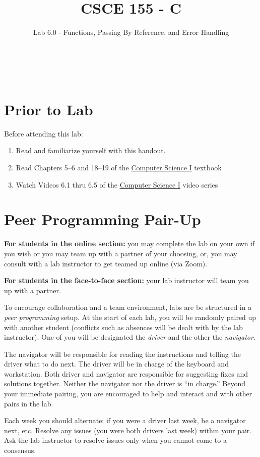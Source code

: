 \documentclass[12pt]{scrartcl}
\title{CSCE 155 - C}
\subtitle{Lab 6.0 - Functions, Passing By Reference, and Error Handling}
\author{~}
\date{~}
\begin{document}
\maketitle

\section*{Prior to Lab}

Before attending this lab:
\begin{enumerate}
  \item Read and familiarize yourself with this handout.
  \item Read Chapters 5--6 and 18--19 of the \href{http://cse.unl.edu/~cbourke/ComputerScienceOne.pdf}{Computer Science I} textbook
  \item Watch Videos 6.1 thru 6.5 of the \href{https://www.youtube.com/playlist?list=PL4IH6CVPpTZVkiEnCEOdGbYsFEdtKc5Bx}{Computer Science I} video series
\end{enumerate}

\section*{Peer Programming Pair-Up}

\textbf{For students in the online section:} you may complete
the lab on your own if you wish or you may team up with a partner
of your choosing, or, you may consult with a lab instructor to get
teamed up online (via Zoom).

\textbf{For students in the face-to-face section:} your
lab instructor will team you up with a partner.  

To encourage collaboration and a team environment, labs are be
structured in a \emph{peer programming} setup.  At the start of
each lab, you will be randomly paired up with another student 
(conflicts such as absences will be dealt with by the lab instructor).
One of you will be designated the \emph{driver} and the other
the \emph{navigator}.  

The navigator will be responsible for reading the instructions and
telling the driver what to do next.  The driver will be in charge of the
keyboard and workstation.  Both driver and navigator are responsible
for suggesting fixes and solutions together.  Neither the navigator
nor the driver is ``in charge.''  Beyond your immediate pairing, you
are encouraged to help and interact and with other pairs in the lab.

Each week you should alternate: if you were a driver last week, 
be a navigator next, etc.  Resolve any issues (you were both drivers
last week) within your pair.  Ask the lab instructor to resolve issues
only when you cannot come to a consensus.  
\end{document}
